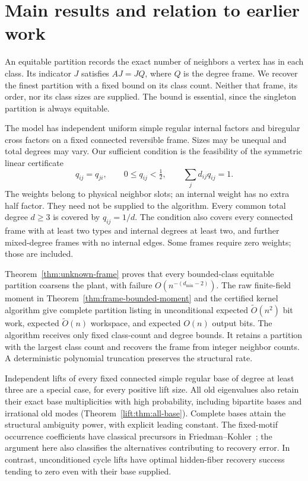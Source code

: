\section{Main results and relation to earlier work}\label{sec:overview}
An equitable partition records the exact number of neighbors a vertex
has in each class. Its indicator $J$ satisfies $AJ=JQ$, where $Q$ is
the degree frame. We recover the finest partition with a fixed bound
on its class count. Neither that frame, its order, nor its class sizes
are supplied. The bound is essential, since the singleton partition
is always equitable.

The model has independent uniform simple regular internal factors and
biregular cross factors on a fixed connected reversible frame. Sizes
may be unequal and total degrees may vary. Our sufficient condition is
the feasibility of the symmetric linear certificate
\[
 q_{ij}=q_{ji},\qquad 0\le q_{ij}<\tfrac12,\qquad
 \sum_jd_{ij}q_{ij}=1.
\]
The weights belong to physical neighbor slots; an internal weight
has no extra half factor. They need not be supplied to the algorithm.
Every common total degree $d\ge3$ is covered by $q_{ij}=1/d$.
The condition also covers every connected frame with at least two types
and internal degrees at least two, and further mixed-degree frames with
no internal edges.
Some frames require zero weights; those are included.

Theorem~\ref{thm:unknown-frame} proves that every bounded-class
equitable partition coarsens the plant, with failure
$O(n^{-(d_{\min}-2)})$. The raw finite-field moment in
Theorem~\ref{thm:frame-bounded-moment} and the certified kernel algorithm
give complete partition listing in unconditional expected
$\widetilde O(n^2)$ bit work, expected $\widetilde O(n)$ workspace,
and expected $O(n)$ output bits. The algorithm receives only fixed
class-count and degree bounds. It retains a partition with the largest
class count and recovers the frame from integer neighbor counts.
A deterministic polynomial truncation preserves the structural rate.

Independent lifts of every fixed connected simple regular base of
degree at least three are a special case, for every positive lift
size. All old eigenvalues also retain their exact base multiplicities
with high probability, including bipartite bases and irrational
old modes (Theorem~\ref{lift:thm:all-base}).
Complete bases attain the structural ambiguity power, with explicit
leading constant. The fixed-motif occurrence coefficients have classical
precursors in Friedman--Kohler~\cite{FKMotifs}; the argument here also
classifies the alternatives contributing to recovery error.
In contrast, unconditioned cycle lifts have optimal
hidden-fiber recovery success tending to zero even with their base
supplied.

